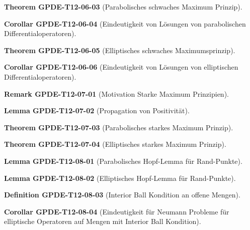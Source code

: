 \documentclass[10pt, letterpaper]{article}
\newcommand{\CustomHeading}[3]{%
  \par\medskip\noindent%
  \textbf{#1 #2} \textnormal{(#3)}.\enskip%
}
\newenvironment{DEF}[2]{\CustomHeading{Definition}{#1}{#2}}{}
\newenvironment{THEO}[2]{\CustomHeading{Theorem}{#1}{#2}}{}
\newenvironment{LEM}[2]{\CustomHeading{Lemma}{#1}{#2}}{}
\newenvironment{KORO}[2]{\CustomHeading{Corollar}{#1}{#2}}{}
\newenvironment{REM}[2]{\CustomHeading{Remark}{#1}{#2}}{}
\begin{document}
\begin{THEO}{GPDE-T12-06-03}{Parabolisches schwaches Maximum Prinzip}
\end{THEO}

\begin{KORO}{GPDE-T12-06-04}{Eindeutigkeit von Lösungen von parabolischen Differentialoperatoren}
\end{KORO}

\begin{THEO}{GPDE-T12-06-05}{Elliptisches schwaches Maximumsprinzip}
\end{THEO}

\begin{KORO}{GPDE-T12-06-06}{Eindeutigkeit von Lösungen von elliptischen Differentialoperatoren}
\end{KORO}

\begin{REM}{GPDE-T12-07-01}{Motivation Starke Maximum Prinzipien}
\end{REM}

\begin{LEM}{GPDE-T12-07-02}{Propagation von Positivität}
\end{LEM}

\begin{THEO}{GPDE-T12-07-03}{Parabolisches starkes Maximum Prinzip}
\end{THEO}

\begin{THEO}{GPDE-T12-07-04}{Elliptisches starkes Maximum Prinzip}
\end{THEO}

\begin{LEM}{GPDE-T12-08-01}{Parabolisches Hopf-Lemma für Rand-Punkte}
\end{LEM}

\begin{LEM}{GPDE-T12-08-02}{Elliptisches Hopf-Lemma für Rand-Punkte}
\end{LEM}

\begin{DEF}{GPDE-T12-08-03}{Interior Ball Kondition an offene Mengen}
\end{DEF}

\begin{KORO}{GPDE-T12-08-04}{Eindeutigkeit für Neumann Probleme für elliptische Operatoren auf Mengen mit Interior Ball Kondition}
\end{KORO}
\end{document}
